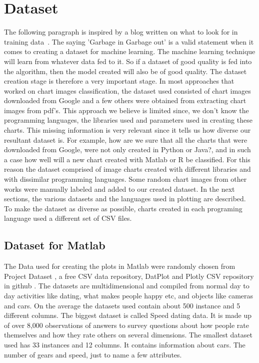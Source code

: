 \documentclass[12pt, a4paper,oneside]{report}
\begin{document}
\section{Dataset}
The following paragraph is inspired by a blog written on what to look for in training data~\cite{edi}.
The saying 'Garbage in Garbage out' is a valid statement when it comes to creating a dataset for machine learning. The machine learning technique will learn from whatever data fed to it. So if a dataset of good quality is fed into the algorithm, then the model created will also be of good quality. The dataset creation stage is therefore a very important stage. In most approaches that worked on chart images classification, the dataset used consisted of chart images downloaded from Google and a few others were obtained from extracting chart images from pdf's. This approach we believe is limited since, we don't know the programming languages, the libraries used and parameters used in creating these charts. This missing information is very relevant since it tells us how diverse our resultant dataset is. For example, how are we sure that all the charts that were downloaded from Google, were not only created in Python or Java?, and in such a case how well will a new chart created with Matlab or R be classified. For this reason the dataset comprised of image charts created with different libraries and with dissimilar programming languages. Some random chart images from other works were manually labeled and added to our created dataset. In the next sections, the various datasets and the languages used in plotting are described. To make the dataset as diverse as possible, charts created in each programing language used a different set of CSV files. 

\subsection{Dataset for Matlab}
The Data used for creating the plots in Matlab were randomly chosen from Project Dataset \cite{projectdataset}, a free CSV data repository, DatPlot \cite{datplot} and Plotly CSV repository in github \cite{plotly}. The datasets are multidimensional and compiled from normal day to day activities like dating, what makes people happy etc, and objects like cameras and cars. On the average the datasets used contain about 500 instance and 5 different columns. The biggest dataset is called Speed dating data. It is made up of over 8,000 observations of answers to survey questions about how people rate themselves and how they rate others on several dimensions. The smallest dataset used has 33 instances and 12 columns. It contains information about cars. The number of gears and speed, just to name a few attributes.
\end{document}
